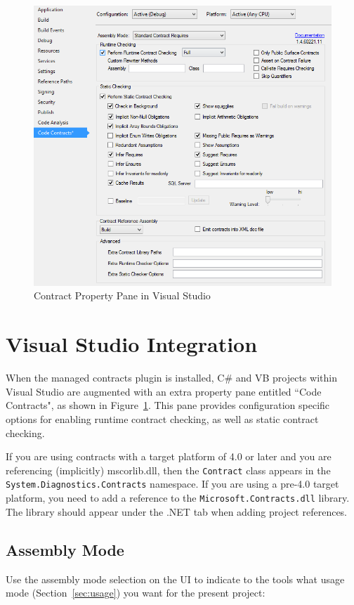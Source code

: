\documentclass{article}
\newcommand{\code}[1]{\lstinline{#1}}
\newcommand{\csharp}{C\#}
\begin{document}
\begin{figure}[tb!]
\begin{center}
  \includegraphics[width=.8\columnwidth]{VSUI1.png}
\end{center}
  \caption{Contract Property Pane in Visual Studio}
  \label{fig:property-pane}
\end{figure}

\section{Visual Studio Integration}
\label{sec:vsintegration}
When the managed contracts plugin is installed, \csharp{} and VB projects
within Visual Studio are augmented with an extra property pane
entitled ``Code Contracts", as shown in Figure~\ref{fig:property-pane}. This pane provides
configuration specific options for enabling runtime contract checking,
as well as static contract checking.

If you are using contracts with a target platform of 4.0 or later and
you are referencing (implicitly) mscorlib.dll, then the
\code{Contract} class appears in the
\code{System.Diagnostics.Contracts} namespace. If you are using a
pre-4.0 target platform, you need to add a reference to the
\code{Microsoft.Contracts.dll} library. The library should appear
under the .NET tab when adding project references.

\subsection{Assembly Mode}
Use the assembly mode selection on the UI to indicate to the tools
what usage mode (Section~\ref{sec:usage}) you want for the
present project:
\end{document}
